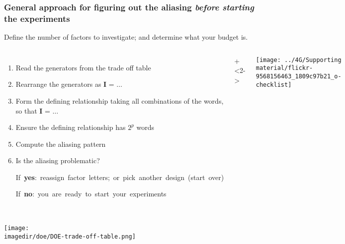 \begin{frame}\frametitle{General approach for figuring out the aliasing \emph{before starting} the experiments}
	
	\vspace{0.5cm}
	Define the number of factors to investigate; and determine what your budget is.
	
	\vspace{0.5cm}
	\begin{columns}[T]
			\begin{enumerate}
				\item	Read the generators from the trade off table 
				\item	Rearrange the generators as  $\textbf{I = \ldots}$
			 	\item	Form the {\color{purple}defining relationship} taking all combinations of the words, so that $\textbf{I = \ldots}$
			 	\item	Ensure the defining relationship has $2^p$ words
				\item	Compute the aliasing pattern
				\item	{\color{myGreen}Is the aliasing problematic?}
				
					\hbox{\hspace{3.5em}If \textbf{yes}: reassign factor letters; or pick another design (start over)}
					
					\hbox{\hspace{3.5em}If \textbf{no}: you are ready to start your experiments}
			\end{enumerate}
			
			\onslide+<2->{
				\centerline{\texttt{[image: ../4G/Supporting material/flickr-9568156463\_1809c97b21\_o-checklist]}}
			
			}
	\end{columns}

	
\end{frame}

\begin{frame}\frametitle{}
	\centerline{\texttt{[image: \\imagedir/doe/DOE-trade-off-table.png]}}
\end{frame}

